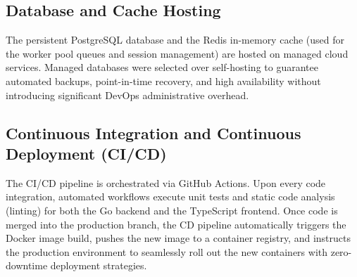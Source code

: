 \subsection{Database and Cache Hosting}
The persistent PostgreSQL database and the Redis in-memory cache (used for the worker pool queues and session management) are hosted on managed cloud services. Managed databases were selected over self-hosting to guarantee automated backups, point-in-time recovery, and high availability without introducing significant DevOps administrative overhead.

\subsection{Continuous Integration and Continuous Deployment (CI/CD)}
The CI/CD pipeline is orchestrated via GitHub Actions. Upon every code integration, automated workflows execute unit tests and static code analysis (linting) for both the Go backend and the TypeScript frontend. Once code is merged into the production branch, the CD pipeline automatically triggers the Docker image build, pushes the new image to a container registry, and instructs the production environment to seamlessly roll out the new containers with zero-downtime deployment strategies.